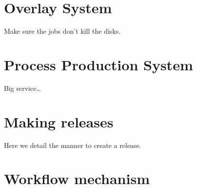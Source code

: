 \documentclass[a4paper,12pt]{article}
\begin{document}
\section{Overlay System}\label{overlaysys}
Make sure the jobs don't kill the disks.

\section{Process Production System}\label{processprodsys}
Big service\ldots

\section{Making releases}\label{makingrelease}
Here we detail the manner to create a release.

\section{Workflow mechanism}\label{workflowsys}
\end{document}
